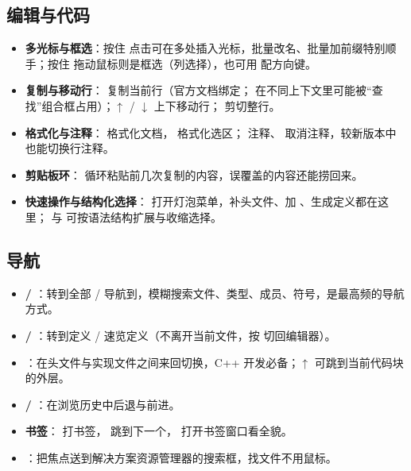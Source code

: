 \subsection{编辑与代码}
\begin{itemize}
  \item \textbf{多光标与框选}：按住  点击可在多处插入光标，批量改名、批量加前缀特别顺手；按住  拖动鼠标则是框选（列选择），也可用  配方向键。
  \item \textbf{复制与移动行}： 复制当前行（官方文档绑定； 在不同上下文里可能被“查找”组合框占用）；$\uparrow$ / $\downarrow$ 上下移动行； 剪切整行。
  \item \textbf{格式化与注释}： 格式化文档， 格式化选区； 注释、 取消注释，较新版本中  也能切换行注释。
  \item \textbf{剪贴板环}： 循环粘贴前几次复制的内容，误覆盖的内容还能捞回来。
  \item \textbf{快速操作与结构化选择}： 打开灯泡菜单，补头文件、加 、生成定义都在这里； 与  可按语法结构扩展与收缩选择。
\end{itemize}
\subsection{导航}
\begin{itemize}
  \item \textbf{ / }：转到全部 / 导航到，模糊搜索文件、类型、成员、符号，是最高频的导航方式。
  \item \textbf{ / }：转到定义 / 速览定义（不离开当前文件，按  切回编辑器）。
  \item \textbf{}：在头文件与实现文件之间来回切换，C++ 开发必备；$\uparrow$ 可跳到当前代码块的外层。
  \item \textbf{ / }：在浏览历史中后退与前进。
  \item \textbf{书签}： 打书签， 跳到下一个， 打开书签窗口看全貌。
  \item \textbf{}：把焦点送到解决方案资源管理器的搜索框，找文件不用鼠标。
\end{itemize}
